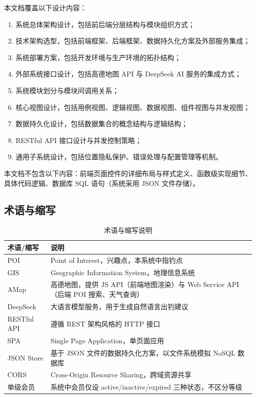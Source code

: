 \documentclass[12pt,a4paper]{ctexart}
\begin{document}
本文档覆盖以下设计内容：
\begin{enumerate}
  \item 系统总体架构设计，包括前后端分层结构与模块组织方式；
  \item 技术架构选型，包括前端框架、后端框架、数据持久化方案及外部服务集成；
  \item 系统部署方案，包括开发环境与生产环境的拓扑结构；
  \item 外部系统接口设计，包括高德地图 API 与 DeepSeek AI 服务的集成方式；
  \item 系统模块划分与模块间调用关系；
  \item 核心视图设计，包括用例视图、逻辑视图、数据视图、组件视图与并发视图；
  \item 数据持久化设计，包括数据集合的概念结构与逻辑结构；
  \item RESTful API 接口设计与并发控制策略；
  \item 通用子系统设计，包括位置隐私保护、错误处理与配置管理等机制。
\end{enumerate}

本文档不包含以下内容：前端页面控件的详细布局与样式定义、函数级实现细节、具体代码逻辑、数据库 SQL 语句（系统采用 JSON 文件存储）。

\subsection{术语与缩写}

\begin{table}[H]
  \centering
  \caption{术语与缩写说明}
  \label{tab:glossary}
  \begin{tabular}{p{3cm}p{9cm}}
    \toprule
    \textbf{术语/缩写} & \textbf{说明} \\
    \midrule
    POI & Point of Interest，兴趣点，本系统中指钓点 \\
    GIS & Geographic Information System，地理信息系统 \\
    AMap & 高德地图，提供 JS API（前端地图渲染）与 Web Service API（后端 POI 搜索、天气查询） \\
    DeepSeek & 大语言模型服务，用于生成自然语言出钓建议 \\
    RESTful API & 遵循 REST 架构风格的 HTTP 接口 \\
    SPA & Single Page Application，单页面应用 \\
    JSON Store & 基于 JSON 文件的数据持久化方案，以文件系统模拟 NoSQL 数据库 \\
    CORS & Cross-Origin Resource Sharing，跨域资源共享 \\
    单级会员 & 系统中会员仅设 active/inactive/expired 三种状态，不区分等级 \\
    \bottomrule
  \end{tabular}
\end{table}
\end{document}
